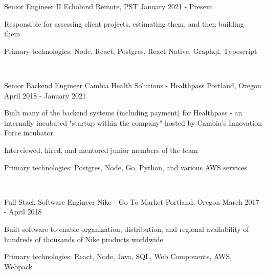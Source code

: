 
\begin{cventries}



  \cventry
  {Senior Engineer II}
  {Echobind}
  {Remote, PST}
  {January 2021 - Present}
  {
    \begin{cvitems}
      \item {Responsible for assessing client projects, estimating them, and then building them}
      \item {Primary technologies: Node, React, Postgres, React Native, Graphql, Typescript}
    \end{cvitems}
  }

  ~

  \cventry
  {Senior Backend Engineer}
  {Cambia Health Solutions - Healthpass}
  {Portland, Oregon}
  {April 2018 - January 2021}
  {
    \begin{cvitems}
      \item {Built many of the backend systems (including payment) for Healthpass - an internally incubated "startup within the company" hosted by Cambia's Innovation Force incubator}
      \item {Interviewed, hired, and mentored junior members of the team}
      \item {Primary technologies: Postgres, Node, Go, Python, and various AWS services}
    \end{cvitems}
  }

  ~

  \cventry
  {Full Stack Software Engineer}
  {Nike - Go To Market}
  {Portland, Oregon}
  {March 2017 - April 2018}
  {
    \begin{cvitems}
      \item {Built software to enable organization, distribution, and regional availability of hundreds of thousands of Nike products worldwide}
      \item {Primary technologies: React, Node, Java, SQL, Web Components, AWS, Webpack}
    \end{cvitems}
  }


\end{cventries}
